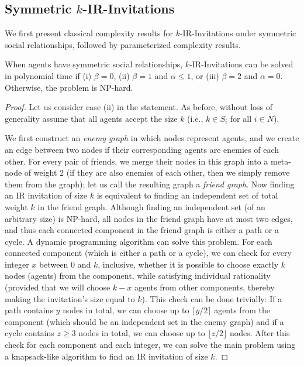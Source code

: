 \subsection{Symmetric $k$-IR-Invitations}

We first present classical complexity results for $k$-IR-Invitations under symmetric social relationships, followed by parameterized complexity results. 


\begin{theorem} \label{SIP:thm:symmetric_IR_p_npc}
	When agents have symmetric social relationships, 
	$k$-IR-Invitations can be solved in polynomial time if (i) $\beta = 0$, (ii) $\beta = 1$ and $\alpha \leq 1$, or (iii) $\beta = 2$ and $\alpha = 0$. Otherwise, the problem is NP-hard. 
\end{theorem}
\begin{proof}
	Let us consider case (ii) in the statement. 
	As before, without loss of generality assume that all agents accept the size $k$ (i.e., $k\in S_i$ for all $i\in N$). 
	
	We first construct an {\em enemy graph} in which nodes represent agents, and we create an edge between two nodes if their corresponding agents are enemies of each other. For every pair of friends, we merge their nodes in this graph into a meta-node of weight $2$ (if they are also enemies of each other, then we simply remove them from the graph); let us call the resulting graph a {\em friend graph}. 
	Now finding an IR invitation of size $k$ is equivalent to finding an independent set of total weight $k$ in the friend graph. Although finding an independent set (of an arbitrary size) is NP-hard, all nodes in the friend graph have at most two edges, and thus each connected component in the friend graph is either a path or a cycle. 
	A dynamic programming algorithm can solve this problem.
	For each connected component (which is either a path or a cycle), we can check for every integer $x$ between $0$ and $k$, inclusive, whether it is possible to choose exactly $k$ nodes (agents) from the component, while satisfying individual rationality (provided that we will choose $k-x$ agents from other components, thereby making the invitation's size equal to $k$). This check can be done trivially: If a path contains $y$ nodes in total, we can choose up to $\lceil y/2 \rceil$ agents from the component (which should be an independent set in the enemy graph) and if a cycle contains $z \geq 3$ nodes in total, we can choose up to $\lfloor z/2 \rfloor$ nodes. After this check for each component and each integer, we can solve the main problem using a knapsack-like algorithm to find an IR invitation of size $k$.


\end{proof}
